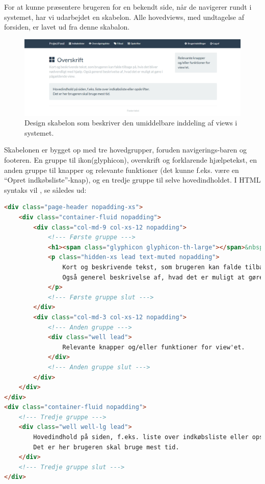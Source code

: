 For at kunne præsentere brugeren for en bekendt side, når de navigerer rundt i systemet, har vi udarbejdet en skabelon. Alle hovedviews, med undtagelse af forsiden, er lavet ud fra denne skabalon.
\begin{figure}[h]
\includegraphics[trim=3.5cm 0cm 3cm 0cm, clip=true, width=1\textwidth]{images/Images/generelt_layout.png}
\caption{Design skabelon som beskriver den umiddelbare inddeling af views i systemet.}\label{ss:design_skabelon}
\end{figure}
Skabelonen er bygget op med tre hovedgrupper, foruden navigerings-baren og footeren. En gruppe til ikon(glyphicon), overskrift og forklarende hjælpetekst, en anden gruppe til knapper og relevante funktioner (det kunne f.eks. være en ``Opret indkøbsliste''-knap), og en tredje gruppe til selve hovedindholdet.
I HTML syntaks vil , se således ud:
\begin{lstlisting}[language=HTML, caption=HTML-kode med de tre hoved grupper, label=html:design_skabelon]
<div class="page-header nopadding-xs">
    <div class="container-fluid nopadding">
        <div class="col-md-9 col-xs-12 nopadding">
            <!--- Første gruppe --->
            <h1><span class="glyphicon glyphicon-th-large"></span>&nbsp;&nbsp;Overskrift</h1>
            <p class="hidden-xs lead text-muted nopadding">
                Kort og beskrivende tekst, som brugeren kan falde tilbage på, hvis det bliver nødvendligt med hjælp.
                Også generel beskrivelse af, hvad det er muligt at gøre i pågældende view.
            </p>
            <!--- Første gruppe slut --->
        </div>
        <div class="col-md-3 col-xs-12 nopadding">
            <!--- Anden gruppe --->            
            <div class="well lead">
                Relevante knapper og/eller funktioner for view'et.
            </div>
            <!--- Anden gruppe slut --->
        </div>
    </div>
</div>
<div class="container-fluid nopadding">
    <!--- Tredje gruppe --->
    <div class="well well-lg lead">
        Hovedindhold på siden, f.eks. liste over indkøbsliste eller opskrifter.<br />
        Det er her brugeren skal bruge mest tid.
    </div>
    <!--- Tredje gruppe slut --->
</div>
\end{lstlisting}

